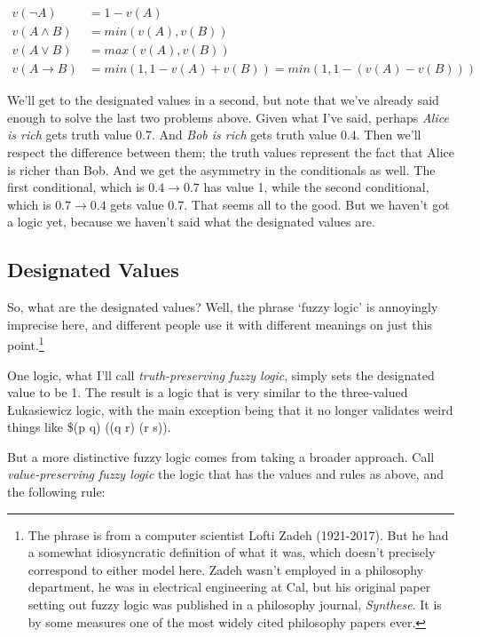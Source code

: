 \documentclass[
]{article}
\begin{document}
\begin{align*}
v(\neg A) &= 1 - v(A) \\
v(A \wedge B) &= min(v(A), v(B)) \\
v(A \vee B) &= max(v(A), v(B)) \\
v(A \rightarrow B) &= min(1, 1 - v(A) + v(B)) = min(1, 1 - (v(A) - v(B)))
\end{align*}

We'll get to the designated values in a second, but note that we've
already said enough to solve the last two problems above. Given what
I've said, perhaps \emph{Alice is rich} gets truth value 0.7. And
\emph{Bob is rich} gets truth value 0.4. Then we'll respect the
difference between them; the truth values represent the fact that Alice
is richer than Bob. And we get the asymmetry in the conditionals as
well. The first conditional, which is \(0.4 \rightarrow 0.7\) has value
1, while the second conditional, which is \(0.7 \rightarrow 0.4\) gets
value 0.7. That seems all to the good. But we haven't got a logic yet,
because we haven't said what the designated values are.

\hypertarget{designated-values}{%
\subsection{Designated Values}\label{designated-values}}

So, what are the designated values? Well, the phrase `fuzzy logic' is
annoyingly imprecise here, and different people use it with different
meanings on just this point.\footnote{The phrase is from a computer
  scientist Lofti Zadeh (1921-2017). But he had a somewhat idiosyncratic
  definition of what it was, which doesn't precisely correspond to
  either model here. Zadeh wasn't employed in a philosophy department,
  he was in electrical engineering at Cal, but his original paper
  setting out fuzzy logic was published in a philosophy journal,
  \emph{Synthese}. It is by some measures one of the most widely cited
  philosophy papers ever.}

One logic, what I'll call \emph{truth-preserving fuzzy logic}, simply
sets the designated value to be 1. The result is a logic that is very
similar to the three-valued Łukasiewicz logic, with the main exception
being that it no longer validates weird things like \$(p \rightarrow q)
\vee ((q \rightarrow r) \vee (r \rightarrow s)).

But a more distinctive fuzzy logic comes from taking a broader approach.
Call \emph{value-preserving fuzzy logic} the logic that has the values
and rules as above, and the following rule:
\end{document}
